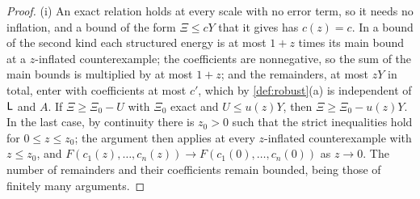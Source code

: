 \begin{proof}
(i) An exact relation holds at every scale with no error term, so it needs
no inflation, and a bound of the form $\Xi\le cY$ that it gives has $c(z)=c$.
In a bound of the second kind each structured energy is at most
$1+z$ times its main bound at a $z$-inflated counterexample; the
coefficients are nonnegative, so the sum of the main bounds is multiplied by
at most $1+z$; and the remainders, at most $zY$ in total, enter with
coefficients at most $c'$, which by \cref{def:robust}(a) is independent of
$\mathsf L$ and $A$. If $\Xi\ge\Xi_0-U$ with $\Xi_0$ exact and $U\le u(z)Y$, then
$\Xi\ge\Xi_0-u(z)Y$. In the last case, by continuity there is $z_0>0$ such
that the strict inequalities hold for $0\le z\le z_0$; the argument then
applies at every $z$-inflated counterexample with $z\le z_0$, and
$F(c_1(z),\dots,c_n(z))\to F(c_1(0),\dots,c_n(0))$ as $z\to0$. The number of
remainders and their coefficients remain bounded, being those of finitely
many arguments.


\end{proof}

